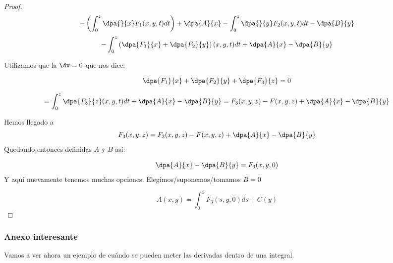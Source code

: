\begin{proof}
\[-\left(\int_0^z \dpa{}{x}F_1(x,y,t)dt\right) + \dpa{A}{x} - \int_0^z \dpa{}{y}F_2(x,y,t)dt - \dpa{B}{y}\]
\[-\int_0^z \left(\dpa{F_1}{x} + \dpa{F_2}{y}\right)(x,y,t)dt + \dpa{A}{x} - \dpa{B}{y} \]

Utilizamos que la $\dv = 0$ que nos dice:

\[\dpa{F_1}{x} + \dpa{F_2}{y} + \dpa{F_3}{z} = 0\]

\[ = \int_0^z \dpa{F_3}{z} (x,y,t)dt + \dpa{A}{x} - \dpa{B}{y} = F_3(x,y,z) - F(x,y,z) + \dpa{A}{x} - \dpa{B}{y}\]

Hemos llegado a \[F_3(x,y,z) =  F_3(x,y,z) - F(x,y,z) + \dpa{A}{x} - \dpa{B}{y}\]
Quedando entonces definidas $A$ y $B$ así:

\[\dpa{A}{x} - \dpa{B}{y} = F_3(x,y,0)\]
Y aquí nuevamente tenemos muchas opciones. Elegimos/suponemos/tomamos $B=0$ 

\[A(x,y) = \int_0^x F_3(s,y,0)ds + C(y)\]
\end{proof}

\subsubsection{Anexo interesante}
Vamos a ver ahora un ejemplo de cuándo se pueden meter las derivadas dentro de una integral.

